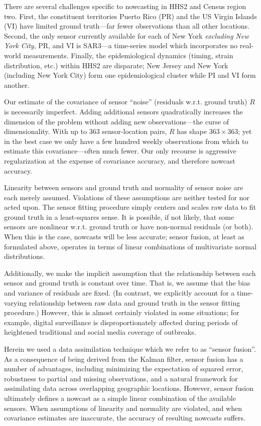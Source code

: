 \documentclass[10pt,letterpaper]{article}
\begin{document}
There are several challenges specific to nowcasting in HHS2 and Census region
two. First, the constituent territories Puerto Rico (PR) and the US Virgin
Islands (VI) have limited ground truth---far fewer observations than all other
locations. Second, the only sensor currently available for each of New York
\textit{excluding New York City}, PR, and VI is SAR3---a time-series model
which incorporates no real-world measurements. Finally, the epidemiological
dynamics (timing, strain distribution, etc.) within HHS2 are disparate; New
Jersey and New York (including New York City) form one epidemiological cluster
while PI and VI form another.

Our estimate of the covariance of sensor ``noise'' (residuals w.r.t. ground
truth) $R$ is necessarily imperfect. Adding additional sensors quadratically
increases the dimension of the problem without adding new observations---the
curse of dimensionality. With up to 363 sensor-location pairs, $R$ has shape
$363 \times 363$; yet in the best case we only have a few hundred weekly
observations from which to estimate this covariance---often much fewer. Our
only recourse is aggressive regularization at the expense of covariance
accuracy, and therefore nowcast accuracy.

Linearity between sensors and ground truth and normality of sensor noise are
each merely assumed. Violations of these assumptions are neither tested for nor
acted upon. The sensor fitting procedure simply centers and scales raw data to
fit ground truth in a least-squares sense. It is possible, if not likely, that
some sensors are nonlinear w.r.t. ground truth or have non-normal residuals (or
both). When this is the case, nowcasts will be less accurate; sensor fusion, at
least as formulated above, operates in terms of linear combinations of
multivariate normal distributions.

Additionally, we make the implicit assumption that the relationship between
each sensor and ground truth is constant over time. That is, we assume that the
bias and variance of residuals are fixed. (In contrast, we explicitly account
for a time-varying relationship between raw data and ground truth in the sensor
fitting procedure.) However, this is almost certainly violated in some
situations; for example, digital surveillance is disproportionately affected
during periods of heightened traditional and social media coverage of
outbreaks.

Herein we used a data assimilation technique which we refer to as ``sensor
fusion''. As a consequence of being derived from the Kalman filter, sensor
fusion has a number of advantages, including minimizing the expectation of
squared error, robustness to partial and missing observations, and a natural
framework for assimilating data across overlapping geographic locations.
However, sensor fusion ultimately defines a nowcast as a simple linear
combination of the available sensors. When assumptions of linearity and
normality are violated, and when covariance estimates are inaccurate, the
accuracy of resulting nowcasts suffers.
\end{document}
